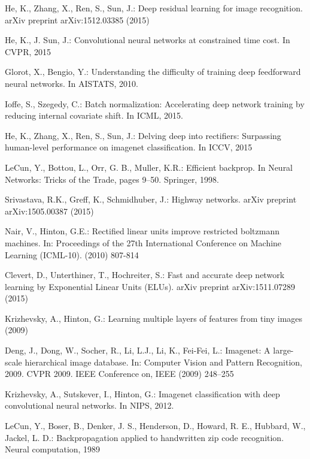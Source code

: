 \documentclass[10pt,twocolumn,letterpaper]{article}
\begin{document}
{\small

\begin{thebibliography}{9}

\bibitem{[1]}
He, K., Zhang, X., Ren, S., Sun, J.: Deep residual learning for image recognition.  arXiv preprint arXiv:1512.03385 (2015)

\bibitem{[2]}
He, K., J. Sun, J.: Convolutional neural networks at constrained time
cost. In CVPR, 2015

\bibitem{[3]}
Glorot, X., Bengio, Y.: Understanding the difficulty of training
deep feedforward neural networks. In AISTATS, 2010.

\bibitem{[4]}
Ioffe, S., Szegedy, C.: Batch normalization: Accelerating deep
network training by reducing internal covariate shift. In ICML, 2015.

\bibitem{[5]}
He, K., Zhang, X., Ren, S., Sun, J.: Delving deep into rectifiers:
Surpassing human-level performance on imagenet classification. In
ICCV, 2015

\bibitem{[6]}
LeCun, Y., Bottou, L., Orr, G. B., Muller, K.R.: Efficient backprop.
In Neural Networks: Tricks of the Trade, pages 9–50. Springer, 1998.

\bibitem{[7]}
Srivastava, R.K., Greff, K., Schmidhuber, J.: Highway networks. arXiv
preprint arXiv:1505.00387 (2015)

\bibitem{[8]}
Nair, V., Hinton, G.E.: Rectified linear units improve restricted boltzmann
machines. In: Proceedings of the 27th International Conference on Machine
Learning (ICML-10). (2010) 807-814

\bibitem{[9]}
Clevert, D., Unterthiner, T., Hochreiter, S.: Fast and accurate deep network
learning by Exponential Linear Units (ELUs). arXiv preprint arXiv:1511.07289 (2015)

\bibitem{[10]}
Krizhevsky, A., Hinton, G.: Learning multiple layers of features from tiny
images (2009)

\bibitem{[11]}
Deng, J., Dong, W., Socher, R., Li, L.J., Li, K., Fei-Fei, L.: Imagenet: A
large-scale hierarchical image database. In: Computer Vision and Pattern
Recognition, 2009. CVPR 2009. IEEE Conference on, IEEE (2009) 248–255

\bibitem{[12]}
Krizhevsky, A., Sutskever, I., Hinton, G.: Imagenet classification
with deep convolutional neural networks. In NIPS, 2012.

\bibitem{[13]}
LeCun, Y., Boser, B., Denker, J. S., Henderson, D., Howard, R. E.,
Hubbard, W., Jackel, L. D.: Backpropagation applied to handwritten
zip code recognition. Neural computation, 1989


\end{thebibliography}}
\end{document}
